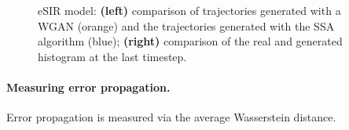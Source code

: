\documentclass{article}
\begin{document}
\begin{figure}[ht]
    \caption{eSIR model: \textbf{(left)} comparison of trajectories generated with a WGAN (orange) and the trajectories generated with the SSA algorithm (blue); \textbf{(right)} comparison of the real and generated histogram at the last timestep.}
    \label{fig:esir_trajectories}
    \end{figure} 

\paragraph{Measuring error propagation.} Error propagation is measured via the average Wasserstein distance.
\begin{figure}[ht]
    \centering
{}

\end{figure}
\end{document}
